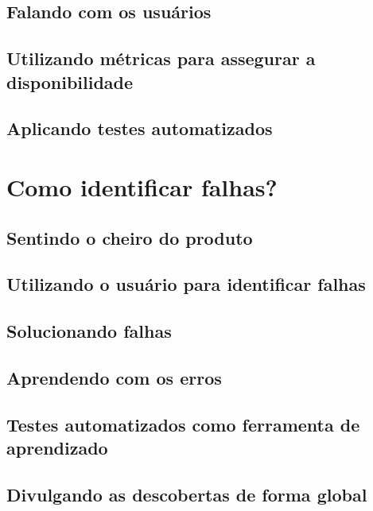     \subsection{Falando com os usuários}
    \subsection{Utilizando métricas para assegurar a disponibilidade}
    \subsection{Aplicando testes automatizados}

  \section{Como identificar falhas?}
    \subsection{Sentindo o cheiro do produto}
    \subsection{Utilizando o usuário para identificar falhas}
    \subsection{Solucionando falhas}
    \subsection{Aprendendo com os erros}
    \subsection{Testes automatizados como ferramenta de aprendizado}
    \subsection{Divulgando as descobertas de forma global}
